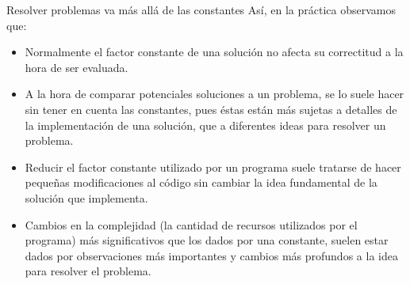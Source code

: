 \documentclass{beamer}
\begin{document}
    \begin{frame}
        \begin{center}
\end{center}
    \end{frame}

    \begin{frame}{Resolver problemas va más allá de las constantes}
        Así, en la práctica observamos que: \pause
        \begin{itemize}
            \item Normalmente el factor constante de una solución no afecta su correctitud a la hora de ser evaluada.
                \pause
            \item A la hora de comparar potenciales soluciones a un problema, se lo suele hacer sin tener en cuenta las constantes, pues éstas están más sujetas a detalles de la implementación de una solución, que a diferentes ideas para resolver un problema.
                \pause
            \item Reducir el factor constante utilizado por un programa suele tratarse de hacer pequeñas modificaciones al código sin cambiar la idea fundamental de la solución que implementa.
                \pause
            \item Cambios en la complejidad (la cantidad de recursos utilizados por el programa) más significativos que los dados por una constante, suelen estar dados por observaciones más importantes y cambios más profundos a la idea para resolver el problema.
        \end{itemize}

    \end{frame}
\end{document}
